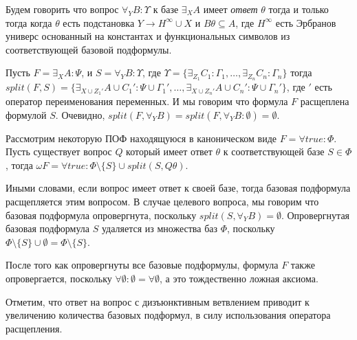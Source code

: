 \begin{definition}[Ответ]
\label{ircond}
Будем говорить что вопрос $\forall_YB\colon\Upsilon$ к базе $\exists_XA$ имеет {\em ответ} $\theta$ тогда и только тогда когда $\theta$ есть подстановка $Y \rightarrow H^{\infty} \cup X$ и $B\theta \subseteq A$, где $H^{\infty}$ есть Эрбранов универс основанный на константах и функциональных символов из соответствующей базовой подформулы.
\end{definition}

\begin{definition}
\label{splitting}
Пусть $F = \exists_XA\colon\Psi$, и $S = \forall_YB\colon\Upsilon$, где $\Upsilon = \{\exists_{Z_1}C_1\colon\Gamma_1,\ldots,\exists_{Z_n}C_n\colon\Gamma_n\}$ тогда $split(F,S) = \{\exists_{X \cup {Z_1}'} A \cup {C_1}'\colon\Psi \cup {\Gamma_1}',\ldots,\exists_{X \cup {Z_n}'} A \cup {C_n}'\colon\Psi \cup {\Gamma_n}'\}$, где $'$ есть оператор переименования переменных. И мы говорим что формула $F$ расщеплена формулой $S$. Очевидно, $split(F,\forall_YB) = split(F,\forall_YB\colon\emptyset) = \emptyset$.
\end{definition}

\begin{definition}
\label{omegarul}
Рассмотрим некоторую ПОФ находящуюся в каноническом виде $F = \forall true\colon\Phi$. Пусть существует вопрос $Q$ который имеет ответ $\theta$ к соответствующей базе $S \in \Phi$, тогда $\omega F  = \forall true:\Phi \setminus \{S\} \cup split(S,Q\theta)$. 
\end{definition}

Иными словами, если вопрос имеет ответ к своей базе, тогда базовая подформула расщепляется этим вопросом. В случае целевого вопроса, мы говорим что базовая подформула опровергнута, поскольку 
$split(S,\forall_YB) = \emptyset$. Опровергнутая базовая подформула $S$ удаляется из множества баз $\Phi$, поскольку $\Phi \setminus \{S\} \cup \emptyset = \Phi \setminus \{S\}$. 

После того как опровергнуты все базовые подформулы, формула $F$ также опровергается, поскольку $\forall \emptyset\colon\emptyset = \forall \emptyset$, а это тождественно ложная аксиома.   

Отметим, что ответ на вопрос с дизъюнктивным ветвлением приводит к увеличению количества базовых подформул, в силу использования оператора расщепления.



